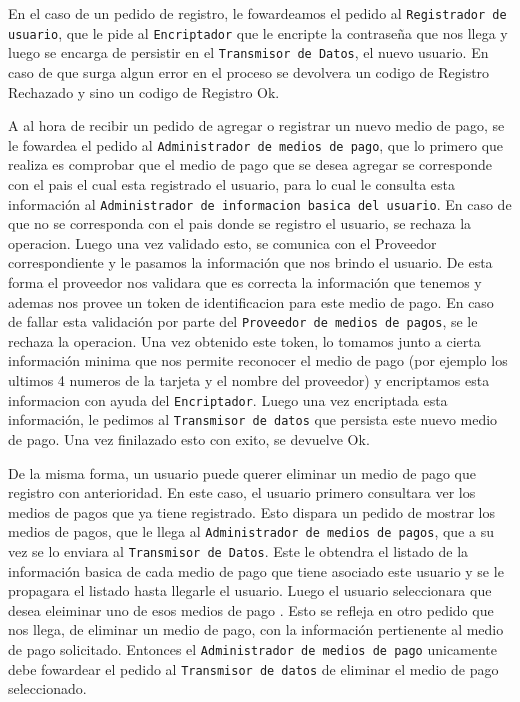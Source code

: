 En el caso de un pedido de registro, le fowardeamos el pedido al \texttt{Registrador de usuario}, que le pide al \texttt{Encriptador} que le encripte la contraseña que nos llega y luego se encarga de persistir en el \texttt{Transmisor de Datos}, el nuevo usuario. En caso de que surga algun error en el proceso se devolvera un codigo de Registro Rechazado y sino un codigo de Registro Ok.

A al hora de recibir un pedido de agregar o registrar un nuevo medio de pago, se le fowardea el pedido al \texttt{Administrador de medios de pago}, que lo primero que realiza es comprobar que el medio de pago que se desea agregar se corresponde con el pais el cual esta registrado el usuario, para lo cual le consulta esta información al \texttt{Administrador de informacion basica del usuario}. En caso de que no se corresponda con el pais donde se registro el usuario, se rechaza la operacion. Luego una vez validado esto, se comunica con el Proveedor correspondiente y le pasamos la información que nos brindo el usuario. De esta forma el proveedor nos validara que es correcta la información que tenemos y ademas nos provee un token de identificacion para este medio de pago. En caso de fallar esta validación por parte del \texttt{Proveedor de medios de pagos}, se le rechaza la operacion. Una vez obtenido este token, lo tomamos junto a cierta información minima que nos permite reconocer el medio de pago (por ejemplo los ultimos 4 numeros de la tarjeta y el nombre del proveedor) y encriptamos esta informacion con ayuda del \texttt{Encriptador}. Luego una vez encriptada esta información, le pedimos al \texttt{Transmisor de datos} que persista este nuevo medio de pago. Una vez finilazado esto con exito, se devuelve Ok.

De la misma forma, un usuario puede querer eliminar un medio de pago que registro con anterioridad. En este caso, el usuario primero consultara ver los medios de pagos que ya tiene registrado. Esto dispara un pedido de mostrar los medios de pagos, que le llega al \texttt{Administrador de medios de pagos}, que a su vez se lo enviara al \texttt{Transmisor de Datos}. Este le obtendra el listado de la información basica de cada medio de pago que tiene asociado este usuario y se le propagara el listado hasta llegarle el usuario. Luego el usuario seleccionara que desea eleiminar uno de esos medios de pago . Esto se refleja en otro pedido que nos llega, de eliminar un medio de pago, con la información pertienente al medio de pago solicitado. Entonces el \texttt{Administrador de medios de pago} unicamente debe fowardear el pedido al \texttt{Transmisor de datos} de eliminar el medio de pago seleccionado.

